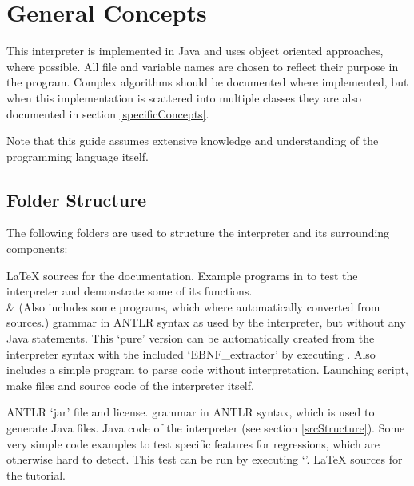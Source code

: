 \section{General Concepts}

This interpreter is implemented in Java and uses object oriented approaches, where possible. All file and variable names are chosen to reflect their purpose in the program. Complex algorithms should be documented where implemented, but when this implementation is scattered into multiple classes they are also documented in section \ref{specificConcepts}.

Note that this guide assumes extensive knowledge and understanding of the \SetlX{} programming language itself.

\subsection{Folder Structure}

The following folders are used to structure the interpreter and its surrounding components:

\begin{itemize}
			{\LaTeX{} sources for the documentation.}
			{Example programs in \SetlX{} to test the interpreter and demonstrate some of its functions.\\&
			 (Also includes some programs, which where automatically converted from \SetlTwo{} sources.)}
			{\SetlX{} grammar in ANTLR syntax as used by the interpreter, but without any Java statements. This `pure' version can be automatically created from the interpreter syntax with the included `EBNF\_extractor' by executing . Also includes a simple program to parse \SetlX{} code without interpretation.}
			{Launching script, make files and source code of the interpreter itself.}
	\begin{itemize}
				{ANTLR `jar' file and license.}
				{\SetlX{} grammar in ANTLR syntax, which is used to generate Java files.}
				{Java code of the interpreter (see section \ref{srcStructure}).}
				{Some very simple \SetlX{} code examples to test specific features for regressions, which are otherwise hard to detect. This test can be run by executing `'.}
			{\LaTeX{} sources for the tutorial.}
	\end{itemize}
\end{itemize}

